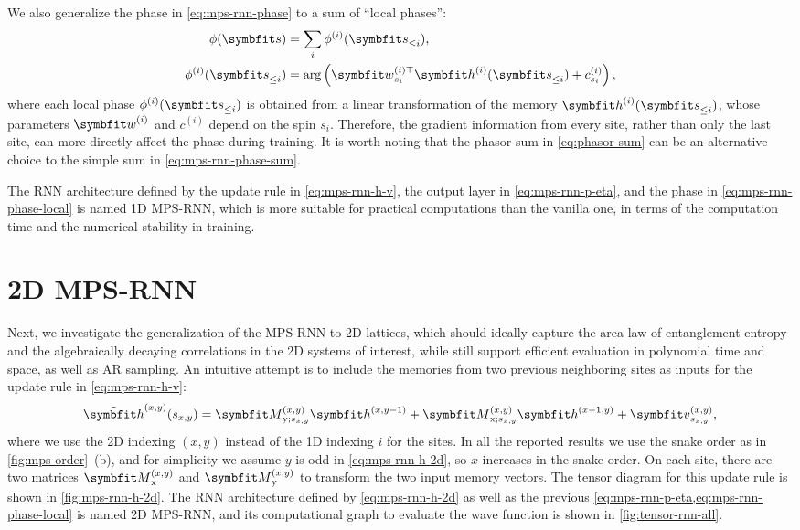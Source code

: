 We also generalize the phase in \cref{eq:mps-rnn-phase} to a sum of ``local phases'':
\begin{align}
\phi(\vs) &= \sum_i \phi^{(i)}(\vs_{\le i}), \label{eq:mps-rnn-phase-sum} \\
\phi^{(i)}(\vs_{\le i}) &= \arg\left( \vw^{(i) \transpose}_{s_i} \vh^{(i)}(\vs_{\le i}) + c^{(i)}_{s_i} \right), \label{eq:mps-rnn-phase-local}
\end{align}
where each local phase $\phi^{(i)}(\vs_{\le i})$ is obtained from a linear transformation of the memory $\vh^{(i)}(\vs_{\le i})$, whose parameters $\vw^{(i)}$ and $c^{(i)}$ depend on the spin $s_i$. Therefore, the gradient information from every site, rather than only the last site, can more directly affect the phase during training. It is worth noting that the phasor sum in \cref{eq:phasor-sum} can be an alternative choice to the simple sum in \cref{eq:mps-rnn-phase-sum}.

The RNN architecture defined by the update rule in \cref{eq:mps-rnn-h-v}, the output layer in \cref{eq:mps-rnn-p-eta}, and the phase in \cref{eq:mps-rnn-phase-local} is named 1D MPS-RNN, which is more suitable for practical computations than the vanilla one, in terms of the computation time and the numerical stability in training.

\section{2D MPS-RNN}
\label{sec:2d-mps-rnn}

Next, we investigate the generalization of the MPS-RNN to 2D lattices, which should ideally capture the area law of entanglement entropy and the algebraically decaying correlations in the 2D systems of interest, while still support efficient evaluation in polynomial time and space, as well as AR sampling. An intuitive attempt is to include the memories from two previous neighboring sites as inputs for the update rule in \cref{eq:mps-rnn-h-v}:
\begin{equation}
\tilde{\vh}^{(x, y)}(s_{x, y}) =
\mM^{(x, y)}_{\text{y}; s_{x, y}} \vh^{(x, y - 1)}
+ \mM^{(x, y)}_{\text{x}; s_{x, y}} \vh^{(x - 1, y)}
+ \vv^{(x, y)}_{s_{x, y}},
\label{eq:mps-rnn-h-2d}
\end{equation}
where we use the 2D indexing $(x, y)$ instead of the 1D indexing $i$ for the sites. In all the reported results we use the snake order as in \cref{fig:mps-order}~(b), and for simplicity we assume $y$ is odd in \cref{eq:mps-rnn-h-2d}, so $x$ increases in the snake order. On each site, there are two matrices $\mM^{(x, y)}_\text{x}$ and $\mM^{(x, y)}_\text{y}$ to transform the two input memory vectors. The tensor diagram for this update rule is shown in \cref{fig:mps-rnn-h-2d}. The RNN architecture defined by \cref{eq:mps-rnn-h-2d} as well as the previous \cref{eq:mps-rnn-p-eta,eq:mps-rnn-phase-local} is named 2D MPS-RNN, and its computational graph to evaluate the wave function is shown in \cref{fig:tensor-rnn-all}.

